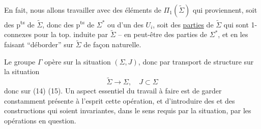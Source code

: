 En fait, nous allons travailler avec des éléments de $\Pi_1(\widetilde\Sigma)$ qui proviennent, soit des p\textsuperscript{ts} de $\widetilde\Sigma$, donc des p\textsuperscript{ts} de $\Sigma^*$ ou d'un des $U_i$, soit des \uline{parties} de $\widetilde\Sigma$ qui sont 1-connexes pour la top. induite par $\widetilde\Sigma$ -- en  peut-être des parties  de $\Sigma^*$, et en les faisant ``déborder'' sur $\widetilde\Sigma$ de façon naturelle.

Le groupe $\Gamma$ opère sur la situation  $(\Sigma,J)$, donc par transport de structure sur la situation
\[
\widetilde\Sigma\longrightarrow\Sigma,\quad J\subset\Sigma
\]
donc sur  (14) (15). Un aspect essentiel du travail à faire est de garder  constamment présente à l'esprit cette opération, et d'introduire des  et des constructions qui soient invariantes, dans le sens requis par la situation, par les opérations en question.
